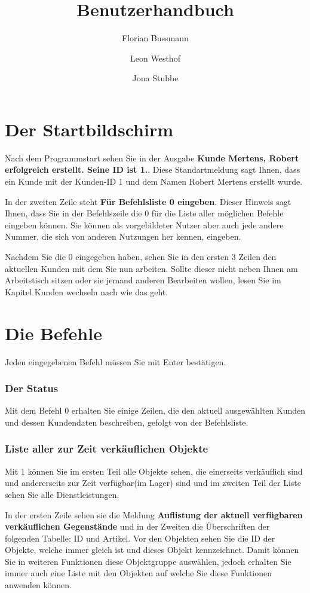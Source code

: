 ﻿\documentclass[a4paper,12pt,titlepage]{article}
\title{Benutzerhandbuch}
\author{Florian Bussmann \and Leon Westhof \and Jona Stubbe}
\newcommand\enquote[1]{{\ttfamily \bfseries #1}}
\begin{document}
\maketitle
\tableofcontents

\part{Der Startbildschirm}
Nach dem Programmstart sehen Sie in der Ausgabe \enquote{Kunde Mertens, Robert erfolgreich erstellt. Seine ID ist 1.}.
Diese Standartmeldung sagt Ihnen, dass ein Kunde mit der Kunden-ID 1 und dem Namen Robert Mertens erstellt wurde.

In der zweiten Zeile steht \enquote{Für Befehlsliste 0 eingeben}.
Dieser Hinweis sagt Ihnen, dass Sie in der Befehlszeile die 0 für die Liste aller möglichen Befehle eingeben können.
Sie können als vorgebildeter Nutzer aber auch jede andere Nummer, die sich von anderen Nutzungen her kennen, eingeben.

Nachdem Sie die 0 eingegeben haben, sehen Sie in den ersten 3 Zeilen den aktuellen Kunden mit dem Sie nun arbeiten.
Sollte dieser nicht neben Ihnen am Arbeitstisch sitzen oder sie jemand anderen Bearbeiten wollen, lesen Sie im Kapitel Kunden wechseln nach wie das geht.

\part{Die Befehle}
Jeden eingegebenen Befehl müssen Sie mit Enter bestätigen.

\section{Der Status}
Mit dem Befehl 0 erhalten Sie einige Zeilen, die den aktuell ausgewählten Kunden und dessen Kundendaten beschreiben,
gefolgt von der Befehlsliste.

\section{Liste aller zur Zeit verkäuflichen Objekte}
Mit 1 können Sie im ersten Teil alle Objekte sehen,
 die einerseits verkäuflich sind und andererseits zur Zeit verfügbar(im Lager) sind und im zweiten Teil der Liste sehen Sie alle Dienstleistungen.

In der ersten Zeile sehen sie die Meldung \enquote{Auflistung der aktuell verfügbaren verkäuflichen Gegenstände}
 und in der Zweiten die Überschriften der folgenden Tabelle: ID und Artikel.
Vor den Objekten sehen Sie die ID der Objekte, welche immer gleich ist
 und dieses Objekt kennzeichnet.
Damit können Sie in weiteren Funktionen diese Objektgruppe auswählen,
 jedoch erhalten Sie immer auch eine Liste mit den Objekten auf welche Sie diese Funktionen anwenden können.
\end{document}
